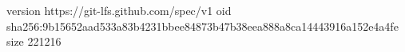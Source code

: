 version https://git-lfs.github.com/spec/v1
oid sha256:9b15652aad533a83b4231bbee84873b47b38eea888a8ca14443916a152e4a4fe
size 221216
